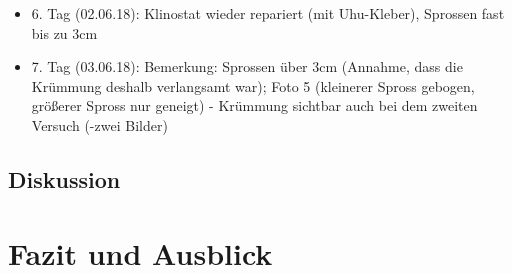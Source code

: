 \documentclass[
a4paper, 
11pt, 
ngerman,
listof=totoc,
bibliography=totocnumbered,
abstracton
]{scrreprt}
\begin{document}
\begin{itemize}
\item 6. Tag (02.06.18): Klinostat wieder repariert (mit Uhu-Kleber), Sprossen fast bis zu 3cm

\item 7. Tag (03.06.18): Bemerkung: Sprossen über 3cm (Annahme, dass die Krümmung deshalb verlangsamt war); Foto 5 (kleinerer Spross gebogen, größerer Spross nur geneigt)
- Krümmung sichtbar auch bei dem zweiten Versuch 
(-zwei Bilder)
\end{itemize}

\section{Diskussion}

\chapter{Fazit und Ausblick}


\printbibliography

% 
% 
%

\end{document}
